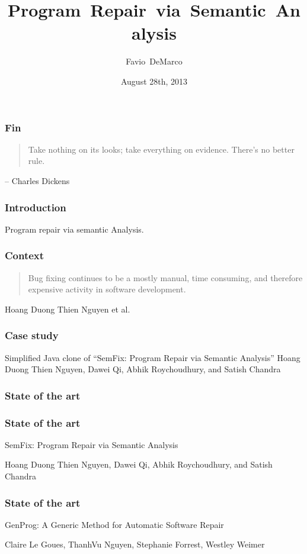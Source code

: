 \documentclass{beamer}
\title
  [Program Repair via Semantic Analysis]
  {Program~Repair~via~Semantic~Analysis}
\author[DeMarco]{Favio~DeMarco}
\institute[U.B.A. - INRIA]{Universidad de Buenos Aires - INRIA}
\date[08/28/2013]{August 28th, 2013}
\begin{document}
  \frame
  {
    \frametitle{Fin}
\begin{quote}
    Take nothing on its looks; take everything on evidence. There's no better rule.
\end{quote}    
– Charles Dickens 
  }

\frame
  {
    \titlepage
  }

  \frame
  {
    \frametitle{Introduction}
    Program repair via semantic Analysis.
  }

  \frame
  {
    \frametitle{Context}
    \begin{quote}
    Bug fixing continues to be a mostly manual, time consuming, and therefore expensive activity in software development.
    \end{quote}
    Hoang Duong Thien Nguyen et al.
}

  \frame
  {
    \frametitle{Case study}
    Simplified Java clone of ``SemFix: Program Repair via Semantic Analysis''
Hoang Duong Thien Nguyen, Dawei Qi, Abhik Roychoudhury, and Satish Chandra
  }

{
%
  \frame
  {
    \frametitle{State of the art}
  }
}

  \frame
  {
    \frametitle{State of the art}
    SemFix: Program Repair via Semantic Analysis

Hoang Duong Thien Nguyen, Dawei Qi, Abhik Roychoudhury, and Satish Chandra

  }


  \frame
  {
    \frametitle{State of the art}
    GenProg: A Generic Method for Automatic Software Repair
    
Claire Le Goues, ThanhVu Nguyen, Stephanie Forrest, Westley Weimer
  }
\end{document}
